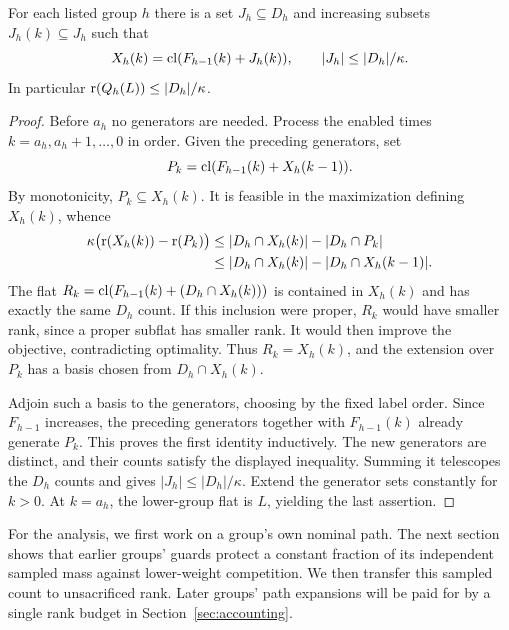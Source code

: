 \begin{lemma}\label{lem:generators}
For each listed group $h$ there is a set $J_h\subseteq D_h$ and increasing
subsets $J_h(k)\subseteq J_h$ such that
\begin{equation}\label{eq:generator-budget}
 X_h(k)=\operatorname{cl}(F_{h-1}(k)+J_h(k)),\qquad
 |J_h|\le |D_h|/\kappa.
\end{equation}
In particular $\operatorname{r}(Q_h(L))\le |D_h|/\kappa$.
\end{lemma}
\begin{proof}
Before $a_h$ no generators are needed. Process the enabled times
$k=a_h,a_h+1,\ldots,0$ in order. Given the preceding generators, set
\[
 P_k=\operatorname{cl}(F_{h-1}(k)+X_h(k-1)).
\]
By monotonicity, $P_k\subseteq X_h(k)$. It is feasible in the maximization
defining $X_h(k)$, whence
\begin{align*}
 \kappa\bigl(\operatorname{r}(X_h(k))-\operatorname{r}(P_k)\bigr)
 &\le |D_h\cap X_h(k)|-|D_h\cap P_k|\\
 &\le |D_h\cap X_h(k)|-|D_h\cap X_h(k-1)|.
\end{align*}
The flat $R_k=\operatorname{cl}(F_{h-1}(k)+(D_h\cap X_h(k)))$ is contained in
$X_h(k)$ and has exactly the same $D_h$ count. If this inclusion were
proper, $R_k$ would have smaller rank, since a proper subflat has
smaller rank. It would then improve the objective, contradicting
optimality. Thus $R_k=X_h(k)$, and the extension over $P_k$ has a
basis chosen from $D_h\cap X_h(k)$.

Adjoin such a basis to the generators, choosing by the fixed label order.
Since $F_{h-1}$ increases, the preceding generators together with
$F_{h-1}(k)$ already generate $P_k$. This proves the first identity
inductively. The new generators are distinct, and their counts satisfy
the displayed inequality. Summing it telescopes the $D_h$ counts and
gives $|J_h|\le |D_h|/\kappa$. Extend the generator sets constantly
for $k>0$. At $k=a_h$, the lower-group flat is $L$, yielding the last
assertion.
\end{proof}

For the analysis, we first work on a group's own nominal path. The next
section shows that earlier groups' guards protect a constant fraction of
its independent sampled mass against lower-weight competition. We then
transfer this sampled count to unsacrificed rank. Later groups' path
expansions will be paid for by a single rank budget in
Section~\ref{sec:accounting}.
